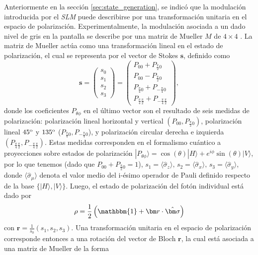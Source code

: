 Anteriormente en la sección \ref{sec:state_generation}, se indicó que la modulación introducida por el {\it SLM} puede describirse por una transformación unitaria en el espacio de polarización. Experimentalmente, la modulación asociada a un dado nivel de gris en la pantalla se describe por una matriz de Mueller $M$ de $4\times 4$ \cite{marquez2008}. La matriz de Mueller actúa como una transformación lineal en el estado de polarización, el cual se representa por el vector de Stokes $\bm s$, definido como
\begin{equation}
\bm s=\begin{pmatrix}s_0\\  s_1\\ s_2\\ s_3\end{pmatrix}=\begin{pmatrix}P_{00}+P_{\frac{\pi}{2}0}\\  P_{00}-P_{\frac{\pi}{2}0}\\ P_{\frac{\pi}{4}0}+P_{-\frac{\pi}{4}0}\\ P_{\frac{\pi}{4}\frac{\pi}{2}}+P_{-\frac{\pi}{4}\frac{\pi}{2}}\end{pmatrix},
\end{equation}
donde los coeficientes $P_{\theta\phi}$ en el último vector son el resultado de 
seis medidas de polarización: polarización lineal horizontal y vertical $(P_{00},P_{\frac{\pi}{2}0})$, polarización lineal  $45^{\rm o}$ y $135^{\rm o}$ ($P_{\frac{\pi}{4}0}, P_{-\frac{\pi}{4}0}$), y
polarización circular derecha e izquierda
$(P_{\frac{\pi}{4}\frac{\pi}{2}}, P_{-\frac{\pi}{4}\frac{\pi}{2}})$. 
Estas medidas corresponden en el formalismo cuántico a proyecciones sobre estados de polarización  $|P_{\theta\phi}\rangle=\cos(\theta)|H\rangle+e^{i\phi}\sin(\theta)|V\rangle$, por lo que tenemos (dado que  $P_{00}+P_{\frac{\pi}{2}0}=1$),  $s_{1}=\langle\hat{\sigma}_{z}\rangle,\,s_{2}=\langle\hat{\sigma}_{x}\rangle,\,s_{3}=\langle\hat{\sigma}_{y}\rangle$, 
donde $\langle\hat{\sigma}_{\mu}\rangle$ denota el valor medio del 
i-ésimo operador de Pauli definido respecto de la base $\{|H\rangle, |V\rangle\}$. Luego, el estado de polarización del fotón individual está dado por
\begin{equation}
    \rho=\frac{1}{2}\left(\mathbbm{1}+\bm r\cdot\hat{\bm\sigma}\right) 
\end{equation}
con $\bm r=\frac{1}{s_0}(s_1,s_2,s_3)$. Una transformación unitaria en el espacio de polarización corresponde entonces a una rotación del vector de Bloch $\bm r$, 
la cual está asociada a una matriz de Mueller de la forma
